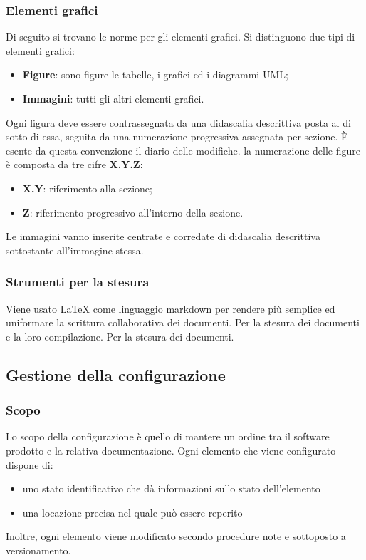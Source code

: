 	    \subsubsection{Elementi grafici}
	    Di seguito si trovano le norme per gli elementi grafici. Si distinguono due tipi di elementi grafici:
	    \begin{itemize}
	        \item \textbf{Figure}: sono figure le tabelle, i grafici ed i diagrammi UML;
	        \item \textbf{Immagini}: tutti gli altri elementi grafici. 
	    \end{itemize}
	    Ogni figura deve essere contrassegnata da una didascalia descrittiva posta al di sotto di essa, seguita da una numerazione progressiva assegnata per sezione. È esente da questa convenzione il diario delle modifiche.
	    la numerazione delle figure è composta da tre cifre \textbf{X.Y.Z}:
	    \begin{itemize}
	        \item \textbf{X.Y}: riferimento alla sezione;
	        \item \textbf{Z}: riferimento progressivo all'interno della sezione.
	    \end{itemize}
	    Le immagini vanno inserite centrate e corredate di didascalia descrittiva sottostante all'immagine stessa.
	    \subsubsection{Strumenti per la stesura}
	    Viene usato LaTeX come linguaggio markdown per rendere più semplice ed uniformare la scrittura collaborativa dei documenti.
	    Per la stesura dei documenti e la loro compilazione.
	    Per la stesura dei documenti.
	
	\subsection{Gestione della configurazione}
		
		\subsubsection{Scopo}
		Lo scopo della configurazione è quello di mantere un ordine tra il software prodotto e la relativa documentazione. Ogni elemento che viene configurato dispone di:
			\begin{itemize}
				\item uno stato identificativo che dà informazioni sullo stato dell'elemento
				\item una locazione precisa nel quale può essere reperito
			\end{itemize}
		Inoltre, ogni elemento viene modificato secondo procedure note e sottoposto a versionamento.
		
